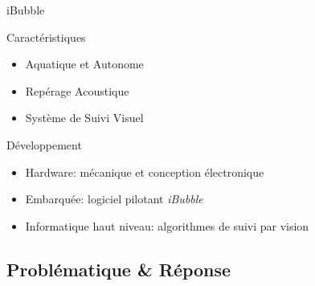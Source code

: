 \documentclass{bredelebeamer}
\begin{document}
\begin{frame}{iBubble}

\begin{block}{Caractéristiques}
\begin{itemize}
\item Aquatique et Autonome
\item Repérage Acoustique
\item Système de Suivi Visuel
\end{itemize}
\end{block}

\begin{block}{Développement}
\begin{itemize}
\item Hardware: mécanique et conception électronique
\item Embarquée: logiciel pilotant \emph{iBubble}
\item Informatique haut niveau: algorithmes de suivi par vision
\end{itemize}
\end{block}

\end{frame}



	\subsection{Problématique \& Réponse}

\end{document}
